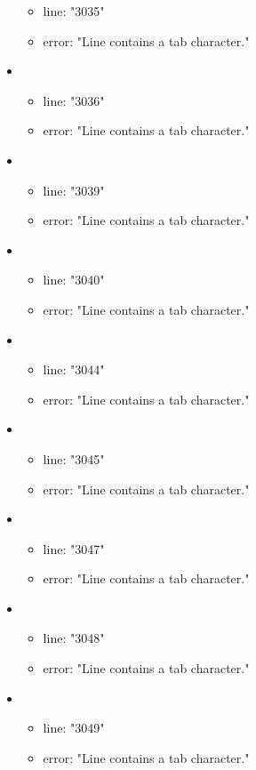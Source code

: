 \begin{itemize}
\begin{itemize}
		\item line: "3035" 
		\item error: "Line contains a tab character." 
	\end{itemize}
	\item 
	\begin{itemize} 
		\item line: "3036" 
		\item error: "Line contains a tab character." 
	\end{itemize}
	\item 
	\begin{itemize} 
		\item line: "3039" 
		\item error: "Line contains a tab character." 
	\end{itemize}
	\item 
	\begin{itemize} 
		\item line: "3040" 
		\item error: "Line contains a tab character." 
	\end{itemize}
	\item 
	\begin{itemize} 
		\item line: "3044" 
		\item error: "Line contains a tab character." 
	\end{itemize}
	\item 
	\begin{itemize} 
		\item line: "3045" 
		\item error: "Line contains a tab character." 
	\end{itemize}
	\item 
	\begin{itemize} 
		\item line: "3047" 
		\item error: "Line contains a tab character." 
	\end{itemize}
	\item 
	\begin{itemize} 
		\item line: "3048" 
		\item error: "Line contains a tab character." 
	\end{itemize}
	\item 
	\begin{itemize} 
		\item line: "3049" 
		\item error: "Line contains a tab character." 

\end{itemize}
\end{itemize}
